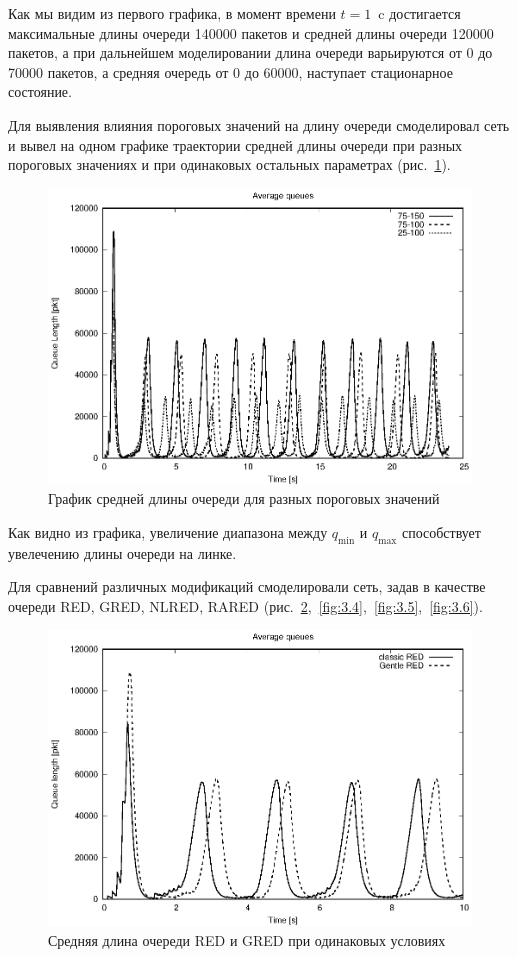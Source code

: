Как мы видим из первого графика, в момент времени $t=1$~c достигается
максимальные длины очереди 140000 пакетов и средней длины очереди
120000 пакетов, а при дальнейшем моделировании длина очереди
варьируются от 0 до 70000 пакетов, а средняя очередь от 0 до 60000,
наступает стационарное состояние.

Для выявления влияния пороговых значений на длину очереди смоделировал
сеть и вывел на одном графике траектории  средней длины очереди при разных
пороговых значениях и при одинаковых остальных параметрах
(рис.~\ref{fig:3.2}).

\begin{figure}[!h]
  \centering
  \includegraphics[width=0.6\linewidth]{image/av_queues_maxthresh.eps}
  \caption{График средней длины очереди для разных пороговых значений}
  \label{fig:3.2}
\end{figure}

Как видно из графика, %
увеличение диапазона между $q_{\min}$ и $q_{\max}$ способствует
увелечению длины очереди на линке.

Для сравнений различных модификаций смоделировали сеть, задав в
качестве очереди RED, GRED, NLRED,
RARED (рис.~\ref{fig:3.3},~\ref{fig:3.4},~\ref{fig:3.5},~\ref{fig:3.6}).

\begin{figure}[!h]
  \centering
  \includegraphics[width=0.6\linewidth]{image/av_queues_classic_gentle.eps}
  \caption{Средняя длина очереди RED и GRED при одинаковых условиях}
  \label{fig:3.3}
\end{figure}

